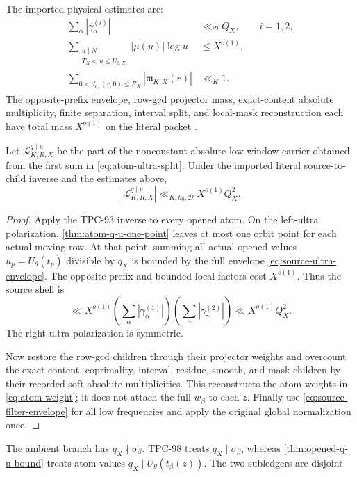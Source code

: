 The imported physical estimates are:
\begin{align}
 \sum_\alpha|\gamma_\alpha^{(i)}|
 &\ll_{\mathscr D}Q_X,\qquad i=1,2,
\label{eq:source-row-l1}\\
 \sum_{\substack{u\mid N\\T_X<u\le U_{0,X}}}
 |\mu(u)|\log u
 &\le X^{o(1)},
\label{eq:source-ultra-envelope}\\
 \sum_{0<d_{q_X}(r,0)\le R_X}
 |\mathfrak m_{K,X}(r)|
 &\ll_K1.
\label{eq:source-filter-envelope}
\end{align}
The opposite-prefix envelope, row-gcd projector mass,
exact-content absolute multiplicity, finite separation, interval
split, and local-mask reconstruction each have total mass
\(X^{o(1)}\) on the literal packet
\citep{WangTPC93,WangTPC98}.

\begin{theorem}
\label{thm:opened-q-u-bound}
Let \(\mathcal L^{q\mid u}_{K,R,X}\) be the part of the
nonconstant absolute low-window carrier obtained from the first sum
in \eqref{eq:atom-ultra-split}.  Under the imported literal
source-to-child inverse and the estimates above,
\begin{equation}
 \boxed{
 |\mathcal L^{q\mid u}_{K,R,X}|
 \ll_{K,h_0,\mathscr D}
 X^{o(1)}Q_X^2.}
\label{eq:opened-q-u-bound}
\end{equation}
\end{theorem}

\begin{proof}
Apply the TPC-93 inverse to every opened atom.  On the left-ultra
polarization, \cref{thm:atom-q-u-one-point} leaves at most one orbit
point for each actual moving row.  At that point, summing all actual
opened values \(u_p=U_\theta(t_p)\) divisible by \(q_X\) is bounded
by the full envelope \eqref{eq:source-ultra-envelope}.  The opposite
prefix and bounded local factors cost \(X^{o(1)}\).  Thus the source
shell is
\[
 \ll X^{o(1)}
 \left(\sum_\alpha|\gamma_\alpha^{(1)}|\right)
 \left(\sum_\gamma|\gamma_\gamma^{(2)}|\right)
 \ll X^{o(1)}Q_X^2.
\]
The right-ultra polarization is symmetric.

Now restore the row-gcd children through their projector weights and
overcount the exact-content, coprimality, interval, residue, smooth,
and mask children by their recorded soft absolute multiplicities.
This reconstructs the atom weights in \eqref{eq:atom-weight}; it
does not attach the full \(w_\beta\) to each \(z\).  Finally use
\eqref{eq:source-filter-envelope} for all low frequencies and apply
the original global normalization once.
\end{proof}

\begin{remark}
The ambient branch has \(q_X\nmid\sigma_\beta\).  TPC-98 treats
\(q_X\mid\sigma_\beta\), whereas
\cref{thm:opened-q-u-bound} treats atom values
\(q_X\mid U_\theta(t_\beta(z))\).  The two subledgers are disjoint.
\end{remark}
